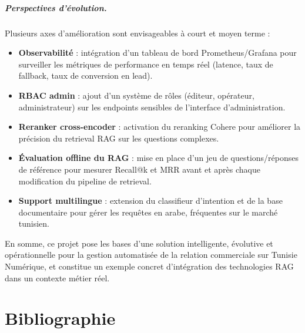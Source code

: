 \documentclass[12pt,a4paper]{report}
\begin{document}
\paragraph{Perspectives d'évolution.}
Plusieurs axes d'amélioration sont envisageables à court et moyen terme :
\begin{itemize}
  \item \textbf{Observabilité} : intégration d'un tableau de bord Prometheus/Grafana pour
  surveiller les métriques de performance en temps réel (latence, taux de fallback,
  taux de conversion en lead).
  \item \textbf{RBAC admin} : ajout d'un système de rôles (éditeur, opérateur, administrateur)
  sur les endpoints sensibles de l'interface d'administration.
  \item \textbf{Reranker cross-encoder} : activation du reranking Cohere pour améliorer
  la précision du retrieval RAG sur les questions complexes.
  \item \textbf{Évaluation offline du RAG} : mise en place d'un jeu de questions/réponses
  de référence pour mesurer Recall@k et MRR avant et après chaque modification du
  pipeline de retrieval.
  \item \textbf{Support multilingue} : extension du classifieur d'intention et de la base
  documentaire pour gérer les requêtes en arabe, fréquentes sur le marché tunisien.
\end{itemize}

En somme, ce projet pose les bases d'une solution intelligente, évolutive et opérationnelle
pour la gestion automatisée de la relation commerciale sur Tunisie Numérique, et constitue
un exemple concret d'intégration des technologies RAG dans un contexte métier réel.

\chapter*{Bibliographie}
\end{document}
